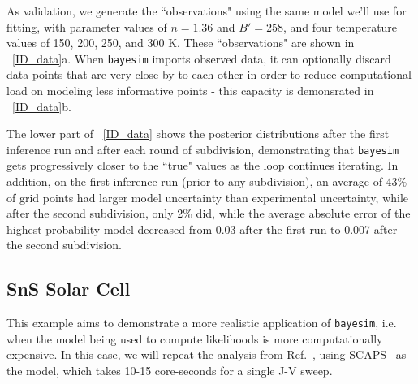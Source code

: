 \documentclass[aps,prl,amsmath,amssymb,superscriptaddress,notitlepage,groupedaddress]{revtex4-1}
\begin{document}
    As validation, we generate the ``observations" using the same model we'll use for fitting, with parameter values of $n=1.36$ and $B'=258$, and four temperature values of 150, 200, 250, and 300 K. These ``observations" are shown in ~\autoref{ID_data}a. When \texttt{bayesim} imports observed data, it can optionally discard data points that are very close by to each other in order to reduce computational load on modeling less informative points - this capacity is demonsrated in ~\autoref{ID_data}b.


    The lower part of ~\autoref{ID_data} shows the posterior distributions after the first inference run and after each round of subdivision, demonstrating that \texttt{bayesim} gets progressively closer to the ``true" values as the loop continues iterating. In addition, on the first inference run (prior to any subdivision), an average of 43\% of grid points had larger model uncertainty than experimental uncertainty, while after the second subdivision, only 2\% did, while the average absolute error of the highest-probability model decreased from 0.03 after the first run to 0.007 after the second subdivision.

  \subsection{SnS Solar Cell}
    This example aims to demonstrate a more realistic application of \texttt{bayesim}, i.e. when the model being used to compute likelihoods is more computationally expensive. In this case, we will repeat the analysis from Ref.~\cite{SnSJoule}, using SCAPS~\cite{SCAPS} as the model, which takes 10-15 core-seconds for a single J-V sweep.
\end{document}
